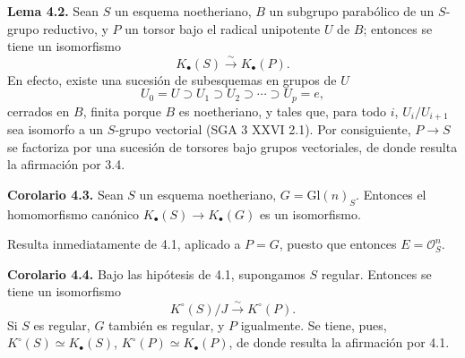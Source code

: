 \textbf{Lema 4.2.} Sean $S$ un esquema noetheriano, $B$ un subgrupo parabólico de un $S$-grupo reductivo, y $P$ un torsor bajo el radical unipotente $U$ de $B$; entonces se tiene un isomorfismo
\[
K_\bullet(S)\xrightarrow{\sim}K_\bullet(P).
\]
En efecto, existe una sucesión de subesquemas en grupos de $U$
\[
U_0=U\supset U_1\supset U_2\supset\cdots\supset U_p=e,
\]
cerrados en $B$, finita porque $B$ es noetheriano, y tales que, para todo $i$, $U_i/U_{i+1}$ sea isomorfo a un $S$-grupo vectorial (SGA 3 XXVI 2.1). Por consiguiente, $P\to S$ se factoriza por una sucesión de torsores bajo grupos vectoriales, de donde resulta la afirmación por 3.4.

\textbf{Corolario 4.3.} Sean $S$ un esquema noetheriano, $G=\mathrm{Gl}(n)_S$. Entonces el homomorfismo canónico $K_\bullet(S)\longrightarrow K_\bullet(G)$ es un isomorfismo.

Resulta inmediatamente de 4.1, aplicado a $P=G$, puesto que entonces $E=\mathcal O_S^n$.

\textbf{Corolario 4.4.} Bajo las hipótesis de 4.1, supongamos $S$ regular. Entonces se tiene un isomorfismo
\[
K^\circ(S)/J\xrightarrow{\sim}K^\circ(P).
\]
Si $S$ es regular, $G$ también es regular, y $P$ igualmente. Se tiene, pues, $K^\circ(S)\simeq K_\bullet(S)$, $K^\circ(P)\simeq K_\bullet(P)$, de donde resulta la afirmación por 4.1.



\providecommand{\Filt}{\operatorname{Filt}}
\providecommand{\Coh}{\operatorname{Coh}}
\providecommand{\Ob}{\operatorname{Ob}}
\providecommand{\longg}{\operatorname{long}}
\providecommand{\degtr}{\operatorname{deg.tr}}
\providecommand{\dimdot}{\operatorname{dim.}}
\providecommand{\Frac}{\operatorname{Frac}}
\providecommand{\fpqc}{\mathrm{fpqc}}
\providecommand{\Sch}{\operatorname{Sch}}
\providecommand{\Picf}{\operatorname{Pic}}
\providecommand{\Ens}{\operatorname{Ens}}
\providecommand{\im}{\operatorname{Im}}
